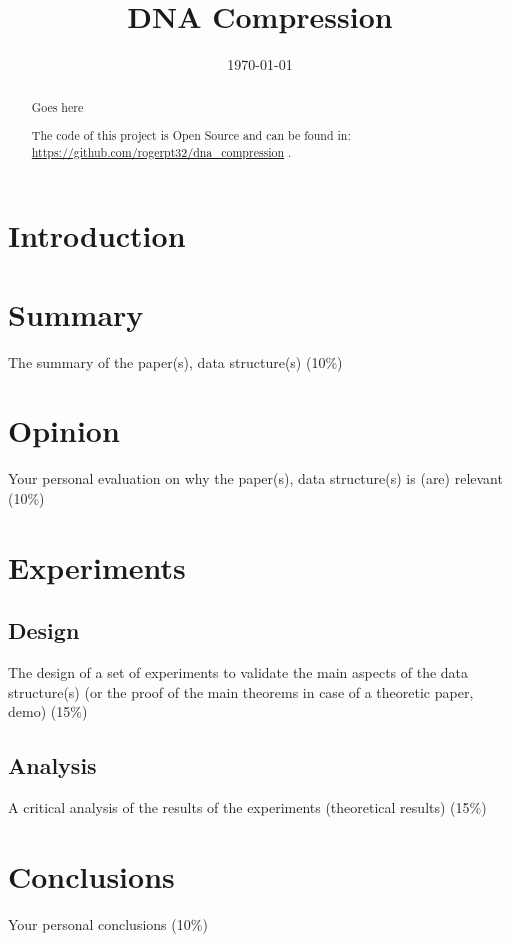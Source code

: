 \documentclass[conference,a4paper]{IEEEtran}
\begin{document}
\title{DNA Compression}

\author{
}

\date{\today}

\maketitle

\begin{abstract}
Goes here

The code of this project is Open Source and can be found in: \url{https://github.com/rogerpt32/dna_compression} \cite{code}.
\end{abstract}

\section{Introduction}


\section{Summary}
The summary of the paper(s), data structure(s) (10\%)

\section{Opinion}
Your personal evaluation on why the paper(s), data structure(s)
is (are) relevant (10\%)

\section{Experiments}
\subsection{Design}
The design of a set of experiments to validate the main aspects of
the data structure(s) (or the proof of the main theorems in case
of a theoretic paper, demo) (15\%)
\subsection{Analysis}
A critical analysis of the results of the experiments (theoretical
results) (15\%)

\section{Conclusions}
Your personal conclusions (10\%)



\end{document}
